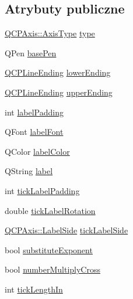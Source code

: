 \subsection*{Atrybuty publiczne}
\begin{DoxyCompactItemize}
\item 
\hyperlink{class_q_c_p_axis_ae2bcc1728b382f10f064612b368bc18a}{Q\+C\+P\+Axis\+::\+Axis\+Type} \hyperlink{class_q_c_p_axis_painter_private_ae04594e97417336933d807c86d353098}{type}
\item 
Q\+Pen \hyperlink{class_q_c_p_axis_painter_private_ab4affb27ae3485fecb7466622cabcbb2}{base\+Pen}
\item 
\hyperlink{class_q_c_p_line_ending}{Q\+C\+P\+Line\+Ending} \hyperlink{class_q_c_p_axis_painter_private_a077696dd1e7efb96e4c199f521433e24}{lower\+Ending}
\item 
\hyperlink{class_q_c_p_line_ending}{Q\+C\+P\+Line\+Ending} \hyperlink{class_q_c_p_axis_painter_private_af764be913be5f924700ac9bbb8c01139}{upper\+Ending}
\item 
int \hyperlink{class_q_c_p_axis_painter_private_a3f7465372df132bf7814345ea697dd34}{label\+Padding}
\item 
Q\+Font \hyperlink{class_q_c_p_axis_painter_private_add1ff1030fbc36112c19b1468ad82d55}{label\+Font}
\item 
Q\+Color \hyperlink{class_q_c_p_axis_painter_private_a5c36467daf057da0cf0792f3c5a06089}{label\+Color}
\item 
Q\+String \hyperlink{class_q_c_p_axis_painter_private_afe004c322f92543c0467afc02da6cf6d}{label}
\item 
int \hyperlink{class_q_c_p_axis_painter_private_a264cfa080e84e536cf2d1ab9c5d5cc5f}{tick\+Label\+Padding}
\item 
double \hyperlink{class_q_c_p_axis_painter_private_ae6ade9232a8e400924009e8edca94bac}{tick\+Label\+Rotation}
\item 
\hyperlink{class_q_c_p_axis_a24b13374b9b8f75f47eed2ea78c37db9}{Q\+C\+P\+Axis\+::\+Label\+Side} \hyperlink{class_q_c_p_axis_painter_private_a9d27f7625fcfbeb3a60193d0c18fc7e9}{tick\+Label\+Side}
\item 
bool \hyperlink{class_q_c_p_axis_painter_private_a546d22b10ddb5ca8582b7deb90223a91}{substitute\+Exponent}
\item 
bool \hyperlink{class_q_c_p_axis_painter_private_a0deb7524009140f00a774dfd286d002c}{number\+Multiply\+Cross}
\item 
int \hyperlink{class_q_c_p_axis_painter_private_ae7360ff805fc6097019de8b35ffbd7e7}{tick\+Length\+In}

\end{DoxyCompactItemize}
